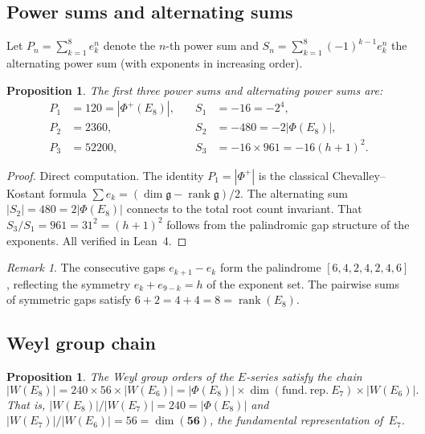 \documentclass[11pt]{amsart}
\theoremstyle{plain}
\newtheorem{proposition}[theorem]{Proposition}
\theoremstyle{definition}
\theoremstyle{remark}
\newtheorem{remark}[theorem]{Remark}
\newcommand{\fg}{\mathfrak{g}}
\renewcommand{\Phi}{\varPhi}
\newcommand{\rank}{\operatorname{rank}}
\begin{document}
\subsection{Power sums and alternating sums}

Let $P_n = \sum_{k=1}^{8} e_k^n$ denote the $n$-th power sum and
$S_n = \sum_{k=1}^{8} (-1)^{k-1} e_k^n$ the alternating power sum
(with exponents in increasing order).

\begin{proposition}\label{prop:power-sums}
The first three power sums and alternating power sums are:
\begin{align*}
  P_1 &= 120 = |\Phi^+(E_8)|, &\quad S_1 &= -16 = -2^4, \\
  P_2 &= 2360, &\quad S_2 &= -480 = -2|\Phi(E_8)|, \\
  P_3 &= 52200, &\quad S_3 &= -16 \times 961 = -16(h+1)^2.
\end{align*}
\end{proposition}

\begin{proof}
Direct computation.  The identity $P_1 = |\Phi^+|$ is the classical
Chevalley--Kostant formula $\sum e_k = (\dim\fg - \rank\fg)/2$.
The alternating sum $|S_2| = 480 = 2|\Phi(E_8)|$ connects to the
total root count invariant.  That $S_3/S_1 = 961 = 31^2 = (h+1)^2$
follows from the palindromic gap structure of the exponents.
All verified in Lean~4.
\end{proof}

\begin{remark}\label{rem:gap-palindrome}
The consecutive gaps $e_{k+1} - e_k$ form the palindrome
$[6, 4, 2, 4, 2, 4, 6]$, reflecting the symmetry $e_k + e_{9-k} = h$
of the exponent set.  The pairwise sums of symmetric gaps satisfy
$6 + 2 = 4 + 4 = 8 = \rank(E_8)$.
\end{remark}

\subsection{Weyl group chain}

\begin{proposition}\label{prop:weyl-chain}
The Weyl group orders of the $E$-series satisfy the chain
\[
  |W(E_8)| = 240 \times 56 \times |W(E_6)|
  = |\Phi(E_8)| \times \dim(\mathrm{fund.\ rep.}\ E_7) \times |W(E_6)|.
\]
That is, $|W(E_8)| / |W(E_7)| = 240 = |\Phi(E_8)|$ and
$|W(E_7)| / |W(E_6)| = 56 = \dim(\mathbf{56})$, the fundamental
representation of~$E_7$.
\end{proposition}
\end{document}
